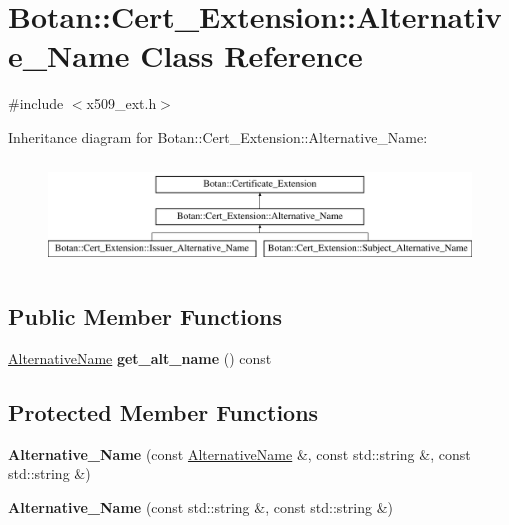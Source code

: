 \hypertarget{classBotan_1_1Cert__Extension_1_1Alternative__Name}{\section{Botan\-:\-:Cert\-\_\-\-Extension\-:\-:Alternative\-\_\-\-Name Class Reference}
\label{classBotan_1_1Cert__Extension_1_1Alternative__Name}
}


{\ttfamily \#include $<$x509\-\_\-ext.\-h$>$}

Inheritance diagram for Botan\-:\-:Cert\-\_\-\-Extension\-:\-:Alternative\-\_\-\-Name\-:\begin{figure}[H]
\begin{center}
\leavevmode
\includegraphics[height=2.818792cm]{classBotan_1_1Cert__Extension_1_1Alternative__Name}
\end{center}
\end{figure}
\subsection*{Public Member Functions}
\begin{DoxyCompactItemize}
\item 
\hypertarget{classBotan_1_1Cert__Extension_1_1Alternative__Name_ac12686f4ad09f16196537c9e08fa622a}{\hyperlink{classBotan_1_1AlternativeName}{Alternative\-Name} {\bfseries get\-\_\-alt\-\_\-name} () const }\label{classBotan_1_1Cert__Extension_1_1Alternative__Name_ac12686f4ad09f16196537c9e08fa622a}

\end{DoxyCompactItemize}
\subsection*{Protected Member Functions}
\begin{DoxyCompactItemize}
\item 
\hypertarget{classBotan_1_1Cert__Extension_1_1Alternative__Name_a32c8cea5aa37eef84a963ad62a28f775}{{\bfseries Alternative\-\_\-\-Name} (const \hyperlink{classBotan_1_1AlternativeName}{Alternative\-Name} \&, const std\-::string \&, const std\-::string \&)}\label{classBotan_1_1Cert__Extension_1_1Alternative__Name_a32c8cea5aa37eef84a963ad62a28f775}

\item 
\hypertarget{classBotan_1_1Cert__Extension_1_1Alternative__Name_af489f08d895f4cdfd492f0dcec46d136}{{\bfseries Alternative\-\_\-\-Name} (const std\-::string \&, const std\-::string \&)}\label{classBotan_1_1Cert__Extension_1_1Alternative__Name_af489f08d895f4cdfd492f0dcec46d136}

\end{DoxyCompactItemize}


